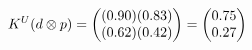 \documentclass[preview]{standalone}
\begin{document}
\begin{align*}
\special{dvisvgm:raw <g id='unique000'>}K^U(d \otimes p) = \begin{pmatrix} (0.90)(0.83) \\ (0.62)(0.42) \end{pmatrix} = \begin{pmatrix} 0.75 \\ 0.27 \end{pmatrix}\special{dvisvgm:raw </g>}
\end{align*}
\end{document}
